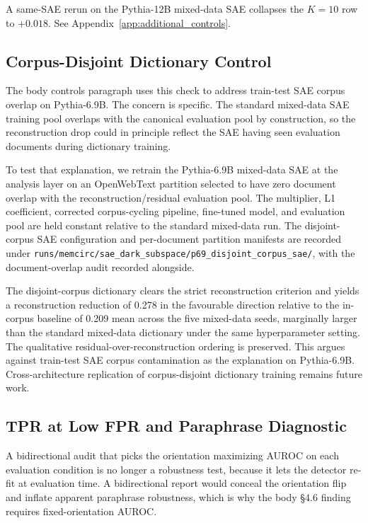 A same-SAE rerun on the Pythia-12B mixed-data SAE collapses the $K=10$ row to $+0.018$. See Appendix~\ref{app:additional_controls}.

\subsection{Corpus-Disjoint Dictionary Control}
\label{app:corpus_disjoint}

The body controls paragraph uses this check to address train-test SAE corpus overlap on Pythia-6.9B. The concern is specific. The standard mixed-data SAE training pool overlaps with the canonical evaluation pool by construction, so the reconstruction drop could in principle reflect the SAE having seen evaluation documents during dictionary training.

To test that explanation, we retrain the Pythia-6.9B mixed-data SAE at the analysis layer on an OpenWebText partition selected to have zero document overlap with the reconstruction/residual evaluation pool. The multiplier, L1 coefficient, corrected corpus-cycling pipeline, fine-tuned model, and evaluation pool are held constant relative to the standard mixed-data run. The disjoint-corpus SAE configuration and per-document partition manifests are recorded under \texttt{runs/\allowbreak{}memcirc/\allowbreak{}sae\_\allowbreak{}dark\_\allowbreak{}subspace/\allowbreak{}p69\_\allowbreak{}disjoint\_\allowbreak{}corpus\_\allowbreak{}sae/\allowbreak{}}, with the document-overlap audit recorded alongside.

The disjoint-corpus dictionary clears the strict reconstruction criterion and yields a reconstruction reduction of 0.278 in the favourable direction relative to the in-corpus baseline of 0.209 mean across the five mixed-data seeds, marginally larger than the standard mixed-data dictionary under the same hyperparameter setting. The qualitative residual-over-reconstruction ordering is preserved. This argues against train-test SAE corpus contamination as the explanation on Pythia-6.9B. Cross-architecture replication of corpus-disjoint dictionary training remains future work.

\subsection{TPR at Low FPR and Paraphrase Diagnostic}
\label{app:tpr_paraphrase}

A bidirectional audit that picks the orientation maximizing AUROC on each evaluation condition is no longer a robustness test, because it lets the detector re-fit at evaluation time. A bidirectional report would conceal the orientation flip and inflate apparent paraphrase robustness, which is why the body §4.6 finding requires fixed-orientation AUROC.

